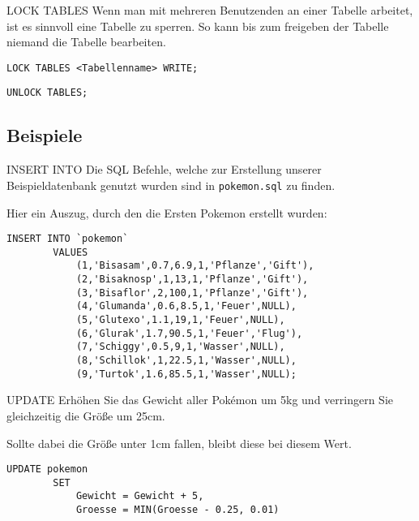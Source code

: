\begin{bonus}{LOCK TABLES}
    Wenn man mit mehreren Benutzenden an einer Tabelle arbeitet, ist es sinnvoll eine Tabelle zu sperren.
    So kann bis zum freigeben der Tabelle niemand die Tabelle bearbeiten.

    \begin{lstlisting}[language=mysql]
        LOCK TABLES <Tabellenname> WRITE;
    \end{lstlisting}

    \begin{lstlisting}[language=mysql]
        UNLOCK TABLES;
    \end{lstlisting}
\end{bonus}
   
\subsection{Beispiele}

\begin{example}{INSERT INTO}
    Die SQL Befehle, welche zur Erstellung unserer Beispieldatenbank genutzt wurden sind in \texttt{pokemon.sql} zu finden.

    Hier ein Auszug, durch den die Ersten Pokemon erstellt wurden:

    \begin{lstlisting}[language=mysql]
        INSERT INTO `pokemon`
        VALUES
            (1,'Bisasam',0.7,6.9,1,'Pflanze','Gift'),
            (2,'Bisaknosp',1,13,1,'Pflanze','Gift'),
            (3,'Bisaflor',2,100,1,'Pflanze','Gift'),
            (4,'Glumanda',0.6,8.5,1,'Feuer',NULL),
            (5,'Glutexo',1.1,19,1,'Feuer',NULL),
            (6,'Glurak',1.7,90.5,1,'Feuer','Flug'),
            (7,'Schiggy',0.5,9,1,'Wasser',NULL),
            (8,'Schillok',1,22.5,1,'Wasser',NULL),
            (9,'Turtok',1.6,85.5,1,'Wasser',NULL);
    \end{lstlisting}
\end{example}

\begin{example}{UPDATE}
    Erhöhen Sie das Gewicht aller Pokémon um 5kg und verringern Sie gleichzeitig die Größe um 25cm.
    
    Sollte dabei die Größe unter 1cm fallen, bleibt diese bei diesem Wert.

    \exampleseparator

    \begin{lstlisting}[language=mysql]
        UPDATE pokemon
        SET
            Gewicht = Gewicht + 5,
            Groesse = MIN(Groesse - 0.25, 0.01)
    \end{lstlisting}
\end{example}

